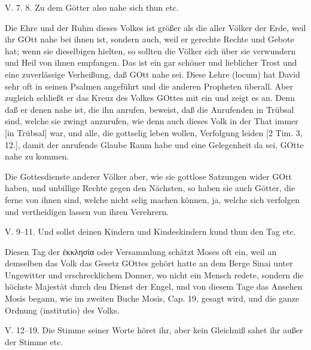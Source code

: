 \begin{schriftzitat}
V. 7. 8. Zu dem Götter also nahe sich thun etc.
\end{schriftzitat}

Die Ehre und der Ruhm dieses Volkes ist größer als die aller Völker der Erde, weil ihr GOtt nahe bei ihnen ist, sondern auch, weil er gerechte Rechte und Gebote hat; wenn sie dieselbigen hielten, so sollten die Völker sich über sie verwundern und Heil von ihnen empfangen. Das ist ein gar schöner und lieblicher Trost und eine zuverlässige Verheißung, daß GOtt nahe sei. Diese Lehre (locum) hat David sehr oft in seinen Psalmen angeführt und die anderen Propheten überall. Aber zugleich schließt er das Kreuz des Volkes GOttes mit ein und zeigt es an. Denn daß er denen nahe ist, die ihn anrufen, beweist, daß die Anrufenden in Trübsal sind, welche sie zwingt anzurufen, wie denn auch dieses Volk in der That immer [in Trübsal] war, und alle, die gottselig leben wollen, Verfolgung leiden [2 Tim. 3, 12.], damit der anrufende Glaube Raum habe und eine Gelegenheit da sei, GOtte nahe zu kommen.

Die Gottesdienste anderer Völker aber, wie sie gottlose Satzungen wider GOtt haben, und unbillige Rechte gegen den Nächsten, so haben sie auch Götter, die ferne von ihnen sind, welche nicht selig machen können, ja, welche sich verfolgen und vertheidigen lassen von ihren Verehrern.

\begin{schriftzitat}
V. 9–11. Und sollst deinen Kindern und Kindeskindern kund thun den Tag etc.
\end{schriftzitat}

Diesen Tag der ἐκκλησία oder Versammlung schätzt Moses oft ein, weil an demselben das Volk das Gesetz GOttes gehört hatte an dem Berge Sinai unter Ungewitter und erschrecklichem Donner, wo nicht ein Mensch redete, sondern die höchste Majestät durch den Dienst der Engel, und von diesem Tage das Ansehen Mosis begann, wie im zweiten Buche Mosis, Cap. 19, gesagt wird, und die ganze Ordnung (institutio) des Volks.

\begin{schriftzitat}
V. 12–19. Die Stimme seiner Worte höret ihr, aber kein Gleichniß sahet ihr außer der Stimme etc.
\end{schriftzitat}

